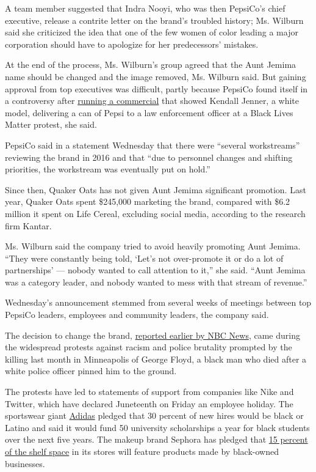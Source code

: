 A team member suggested that Indra Nooyi, who was then PepsiCo's chief
executive, release a contrite letter on the brand's troubled history;
Ms. Wilburn said she criticized the idea that one of the few women of
color leading a major corporation should have to apologize for her
predecessors' mistakes.

At the end of the process, Ms. Wilburn's group agreed that the Aunt
Jemima name should be changed and the image removed, Ms. Wilburn said.
But gaining approval from top executives was difficult, partly because
PepsiCo found itself in a controversy after
\href{https://www.nytimes.com/2017/04/05/business/kendall-jenner-pepsi-ad.html}{running
a commercial} that showed Kendall Jenner, a white model, delivering a
can of Pepsi to a law enforcement officer at a Black Lives Matter
protest, she said.

PepsiCo said in a statement Wednesday that there were ``several
workstreams'' reviewing the brand in 2016 and that ``due to personnel
changes and shifting priorities, the workstream was eventually put on
hold.''

Since then, Quaker Oats has not given Aunt Jemima significant promotion.
Last year, Quaker Oats spent \$245,000 marketing the brand, compared
with \$6.2 million it spent on Life Cereal, excluding social media,
according to the research firm Kantar.

Ms. Wilburn said the company tried to avoid heavily promoting Aunt
Jemima. ``They were constantly being told, `Let's not over-promote it or
do a lot of partnerships' --- nobody wanted to call attention to it,''
she said. ``Aunt Jemima was a category leader, and nobody wanted to mess
with that stream of revenue.''

Wednesday's announcement stemmed from several weeks of meetings between
top PepsiCo leaders, employees and community leaders, the company said.

The decision to change the brand,
\href{https://www.nbcnews.com/news/us-news/aunt-jemima-brand-will-change-name-remove-image-quaker-says-n1231260?cid=sm_npd_ms_tw_ma}{reported
earlier by NBC News}, came during the widespread protests against racism
and police brutality prompted by the killing last month in Minneapolis
of George Floyd, a black man who died after a white police officer
pinned him to the ground.

The protests have led to statements of support from companies like Nike
and Twitter, which have declared Juneteenth on Friday an employee
holiday. The sportswear giant
\href{https://www.nytimes.com/2020/06/10/business/adidas-black-employees-discrimination.html}{Adidas}
pledged that 30 percent of new hires would be black or Latino and said
it would fund 50 university scholarships a year for black students over
the next five years. The makeup brand Sephora has pledged that
\href{https://www.nytimes.com/2020/06/10/business/sephora-black-owned-brands.html}{15
percent of the shelf space} in its stores will feature products made by
black-owned businesses.

